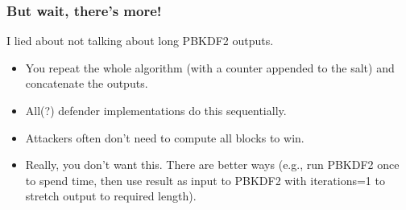 \documentclass[aspectratio=169]{beamer}
\begin{document}
\frame
{
  \frametitle{But wait, there's more!}

  I lied about not talking about long PBKDF2 outputs.

  \begin{itemize}
  \item<1> You repeat the whole algorithm (with a counter appended to the salt) and concatenate the outputs.
  \item<2> All(?) defender implementations do this sequentially.
  \item<3> Attackers often don't need to compute all blocks to win.
  \item<4> Really, you don't want this.  There are better ways ({\footnotesize e.g., run PBKDF2 once to spend time, then use result as input to PBKDF2 with iterations=1 to stretch output to required length}).
  \end{itemize}

}
\end{document}

